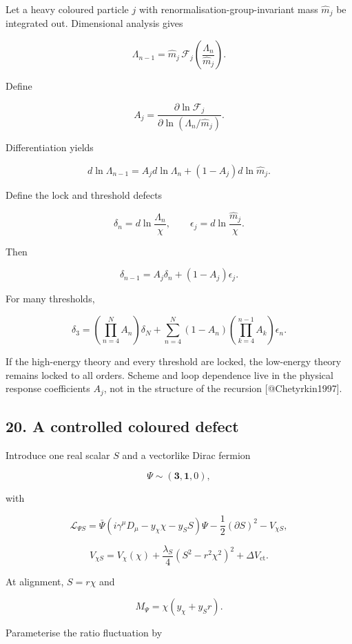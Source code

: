 \documentclass[
]{article}
\begin{document}
Let a heavy coloured particle \(j\) with renormalisation-group-invariant
mass \(\widehat m_j\) be integrated out. Dimensional analysis gives

\[
\Lambda_{n-1}
=\widehat m_j\,
\mathcal F_j\left(\frac{\Lambda_n}{\widehat m_j}\right).
\]

Define

\[
A_j=\frac{\partial\ln\mathcal F_j}
{\partial\ln(\Lambda_n/\widehat m_j)}.
\]

Differentiation yields

\[
d\ln\Lambda_{n-1}
=A_jd\ln\Lambda_n
+(1-A_j)d\ln\widehat m_j.
\]

Define the lock and threshold defects

\[
\delta_n=d\ln\frac{\Lambda_n}{\chi},
\qquad
\epsilon_j=d\ln\frac{\widehat m_j}{\chi}.
\]

Then

\[
\boxed{
\delta_{n-1}=A_j\delta_n+(1-A_j)\epsilon_j.
}
\]

For many thresholds,

\[
\delta_3
=\left(\prod_{n=4}^{N}A_n\right)\delta_N
+\sum_{n=4}^{N}(1-A_n)
\left(\prod_{k=4}^{n-1}A_k\right)\epsilon_n.
\]

If the high-energy theory and every threshold are locked, the low-energy
theory remains locked to all orders. Scheme and loop dependence live in
the physical response coefficients \(A_j\), not in the structure of the
recursion {[}@Chetyrkin1997{]}.

\hypertarget{a-controlled-coloured-defect}{%
\subsection{20. A controlled coloured
defect}\label{a-controlled-coloured-defect}}

Introduce one real scalar \(S\) and a vectorlike Dirac fermion

\[
\Psi\sim(\mathbf3,\mathbf1,0),
\]

with

\[
\mathcal L_{\Psi S}
=\bar\Psi(i\gamma^\mu D_\mu-y_\chi\chi-y_SS)\Psi
-\frac12(\partial S)^2
-V_{\chi S},
\]

\[
V_{\chi S}
=V_\chi(\chi)
+\frac{\lambda_S}{4}(S^2-r^2\chi^2)^2
+\Delta V_{\mathrm{ct}}.
\]

At alignment, \(S=r\chi\) and

\[
M_\Psi=\chi(y_\chi+y_Sr).
\]

Parameterise the ratio fluctuation by
\end{document}
